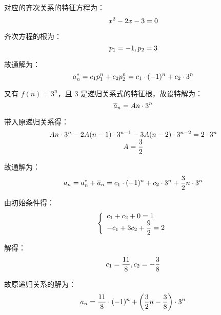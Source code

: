 \documentclass[cn, hazy, blue, normal, 12pt]{elegantnote}
\begin{document}
\begin{solution}[print=true]

    对应的齐次关系的特征方程为：
    \begin{equation}
        \notag
        x^2 - 2x - 3 = 0
    \end{equation}

    齐次方程的根为：
    \begin{equation}
        \notag
        p_1 = -1, p_2 = 3
    \end{equation}

    故通解为：
    \begin{equation}
        \notag
        a_n^\ast = c_1 p_1^n + c_2 p_2^n = c_1 \cdot (-1)^n + c_2 \cdot 3^n
    \end{equation}

    又有 $f(n)=3^n$，且 $3$ 是递归关系式的特征根，故设特解为：
    \begin{equation}
        \notag
        \overline{a}_{n} = An \cdot 3^n
    \end{equation}

    带入原递归关系得：
    \begin{equation}
        \notag
        \begin{array}{c}
            An \cdot 3^{n} - 2A(n-1) \cdot 3^{n-1} -3A(n-2) \cdot 3^{n-2} = 2 \cdot 3^{n} \\
            A = \dfrac{3}{2}
        \end{array}
    \end{equation}

    故通解为：
    \begin{equation}
        \notag
        a_{n} = a_{n}^{\ast} + \overline{a}_{n} = c_1 \cdot (-1)^n + c_2 \cdot 3^n + \dfrac{3}{2} n \cdot 3^n
    \end{equation}

    由初始条件得：
    \begin{equation}
        \notag
        \left\{
        \begin{array}{l}
            c_{1} + c_{2} + 0 = 1 \\
            -c_{1} + 3 c_{2} + \dfrac{9}{2} = 2
        \end{array}
        \right.
    \end{equation}

    解得：
    \begin{equation}
        \notag
        c_{1} = \dfrac{11}{8}, c_{2} = -\dfrac{3}{8}
    \end{equation}

    故原递归关系的解为：
    \begin{equation}
        \notag
        a_{n} = \dfrac{11}{8} \cdot (-1)^n + \left( \dfrac{3}{2} n - \dfrac{3}{8} \right) \cdot 3^n
    \end{equation}

\end{solution}
\end{document}
